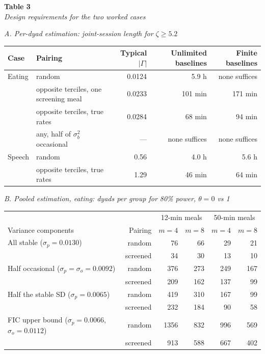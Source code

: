 \documentclass[12pt]{article}
\begin{document}
\newpage

\noindent\textbf{Table 3}\\
\emph{Design requirements for the two worked cases}

\vspace{0.1in}
\begingroup\singlespacing\small
\noindent\emph{A. Per-dyad estimation: joint-session length for $\zeta\geq5.2$}

\vspace{0.05in}
\noindent\begin{tabularx}{\textwidth}{@{}lXrrr@{}}
\toprule
Case & Pairing & Typical $|\Gamma|$ & Unlimited baselines & Finite baselines\\
\midrule
Eating & random & 0.0124 & 5.9 h & none suffices\\
 & opposite terciles, one screening meal & 0.0233 & 101 min & 171 min\\
 & opposite terciles, true rates & 0.0284 & 68 min & 94 min\\
 & any, half of $\sigma_b^2$ occasional & --- & none suffices & none suffices\\
Speech & random & 0.56 & 4.0 h & 5.6 h\\
 & opposite terciles, true rates & 1.29 & 46 min & 64 min\\
\bottomrule
\end{tabularx}

\vspace{0.08in}
\noindent\emph{B. Pooled estimation, eating: dyads per group for 80\% power, $\theta=0$ vs 1}

\vspace{0.05in}
\noindent\begin{tabular}{lrrrrr}
\toprule
& & \multicolumn{2}{c}{12-min meals} & \multicolumn{2}{c}{50-min meals}\\
Variance components & Pairing & $m=4$ & $m=8$ & $m=4$ & $m=8$\\
\midrule
All stable ($\sigma_p=0.0130$) & random & 76 & 66 & 29 & 21\\
 & screened & 34 & 30 & 13 & 10\\
Half occasional ($\sigma_p=\sigma_o=0.0092$) & random & 376 & 273 & 249 & 167\\
 & screened & 209 & 162 & 137 & 99\\
Half the stable SD ($\sigma_p=0.0065$) & random & 419 & 310 & 167 & 99\\
 & screened & 232 & 184 & 90 & 58\\
FIC upper bound ($\sigma_p=0.0066$, $\sigma_o=0.0112$) & random & 1356 & 832 & 996 & 569\\
 & screened & 913 & 588 & 667 & 402\\
\bottomrule
\end{tabular}
\end{document}
